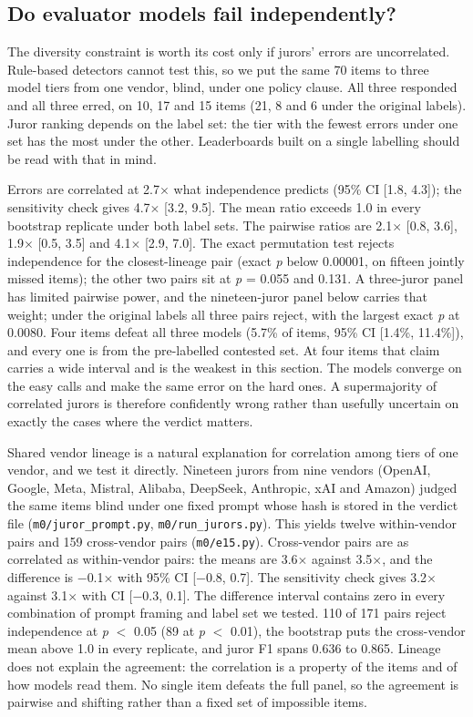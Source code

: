 \documentclass[conference]{IEEEtran}
\begin{document}
\subsection{Do evaluator models fail independently?}

The diversity constraint is worth its cost only if jurors' errors are uncorrelated. Rule-based detectors cannot test this, so we put the same 70 items to three model tiers from one vendor, blind, under one policy clause. All three responded and all three erred, on 10, 17 and 15 items (21, 8 and 6 under the original labels). Juror ranking depends on the label set: the tier with the fewest errors under one set has the most under the other. Leaderboards built on a single labelling should be read with that in mind.

Errors are correlated at 2.7$\times$ what independence predicts (95\% CI [1.8, 4.3]); the sensitivity check gives 4.7$\times$ [3.2, 9.5]. The mean ratio exceeds 1.0 in every bootstrap replicate under both label sets. The pairwise ratios are 2.1$\times$ [0.8, 3.6], 1.9$\times$ [0.5, 3.5] and 4.1$\times$ [2.9, 7.0]. The exact permutation test rejects independence for the closest-lineage pair (exact \textit{p} below 0.00001, on fifteen jointly missed items); the other two pairs sit at \textit{p} = 0.055 and 0.131. A three-juror panel has limited pairwise power, and the nineteen-juror panel below carries that weight; under the original labels all three pairs reject, with the largest exact \textit{p} at 0.0080. Four items defeat all three models (5.7\% of items, 95\% CI [1.4\%, 11.4\%]), and every one is from the pre-labelled contested set. At four items that claim carries a wide interval and is the weakest in this section. The models converge on the easy calls and make the same error on the hard ones. A supermajority of correlated jurors is therefore confidently wrong rather than usefully uncertain on exactly the cases where the verdict matters.

Shared vendor lineage is a natural explanation for correlation among tiers of one vendor, and we test it directly. Nineteen jurors from nine vendors (OpenAI, Google, Meta, Mistral, Alibaba, DeepSeek, Anthropic, xAI and Amazon) judged the same items blind under one fixed prompt whose hash is stored in the verdict file (\texttt{m0/juror\_prompt.py}, \texttt{m0/run\_jurors.py}). This yields twelve within-vendor pairs and 159 cross-vendor pairs (\texttt{m0/e15.py}). Cross-vendor pairs are as correlated as within-vendor pairs: the means are 3.6$\times$ against 3.5$\times$, and the difference is $-$0.1$\times$ with 95\% CI [$-$0.8, 0.7]. The sensitivity check gives 3.2$\times$ against 3.1$\times$ with CI [$-$0.3, 0.1]. The difference interval contains zero in every combination of prompt framing and label set we tested. 110 of 171 pairs reject independence at \textit{p} $<$ 0.05 (89 at \textit{p} $<$ 0.01), the bootstrap puts the cross-vendor mean above 1.0 in every replicate, and juror F1 spans 0.636 to 0.865. Lineage does not explain the agreement: the correlation is a property of the items and of how models read them. No single item defeats the full panel, so the agreement is pairwise and shifting rather than a fixed set of impossible items.
\end{document}
